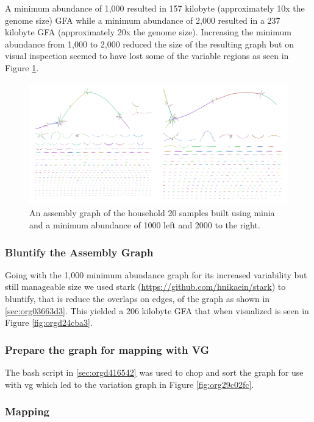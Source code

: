 \documentclass[10pt, a4paper]{article}
\begin{document}
A minimum abundance of 1,000 resulted in 157 kilobyte
(approximately 10x the genome size) GFA while a minimum abundance of 2,000 
resulted in a 237 kilobyte GFA (approximately 20x the genome size).
Increasing the minimum abundance from 1,000 to 2,000 reduced the size of the 
resulting graph but on visual inspection seemed to have lost some of 
the variable regions as seen in Figure \ref{fig:orgcad8e35}.

\begin{figure}[h]
\centering
\includegraphics[width=.9\linewidth]{../Figures/RSV/Assembly_Combined.png}
\caption[RSV Assembly Graph]{\label{fig:orgcad8e35}
An assembly graph of the household 20 samples built using minia and a minimum abundance of 1000 left and 2000 to the right.}
\end{figure}

\subsubsection{Bluntify the Assembly Graph}
\label{sec:org00e9926}
Going with the 1,000 minimum abundance graph for its increased variability but 
still manageable size we used stark (\url{https://github.com/hnikaein/stark}) to 
bluntify, that is reduce the overlaps on edges,
 \cite{gargGraphbasedApproachDiploid2018} of the graph as shown in
\ref{sec:org03663d3}.
This yielded a 206 kilobyte GFA that when visualized is seen in Figure
\ref{fig:orgd24cba3}.

\subsubsection{Prepare the graph for mapping with VG}
\label{sec:org18a1936}
The bash script in \ref{sec:orgd416542} was used to chop and sort the graph
for use with vg \cite{garrisonVariationGraphToolkit2018} which led to the 
variation graph in Figure \ref{fig:org29c02fc}.

\subsubsection{Mapping}
\label{sec:org7a6c94e}
\end{document}
